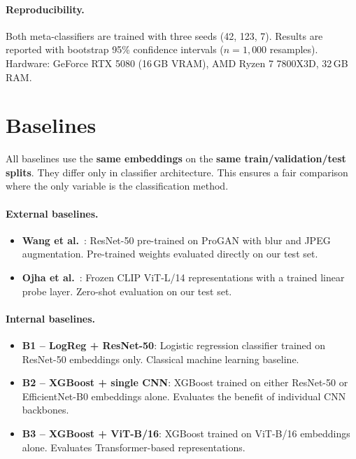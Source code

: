 \paragraph{Reproducibility.}
Both meta-classifiers are trained with three seeds (42, 123, 7). Results are reported with bootstrap 95\% confidence intervals ($n = 1{,}000$ resamples). Hardware: GeForce RTX 5080 (16\,GB VRAM), AMD Ryzen 7 7800X3D, 32\,GB RAM.

\section{Baselines}\label{sec:baselines}

All baselines use the \textbf{same embeddings} on the \textbf{same train/validation/test splits}. They differ only in classifier architecture. This ensures a fair comparison where the only variable is the classification method.

\paragraph{External baselines.}
\begin{itemize}
    \item \textbf{Wang et al.}~\cite{wang2020cnn}: ResNet-50 pre-trained on ProGAN with blur and JPEG augmentation. Pre-trained weights evaluated directly on our test set.
    \item \textbf{Ojha et al.}~\cite{ojha2023towards}: Frozen CLIP ViT-L/14 representations with a trained linear probe layer. Zero-shot evaluation on our test set.
\end{itemize}

\paragraph{Internal baselines.}
\begin{itemize}
    \item \textbf{B1 -- LogReg + ResNet-50}: Logistic regression classifier trained on ResNet-50 embeddings only. Classical machine learning baseline.
    \item \textbf{B2 -- XGBoost + single CNN}: XGBoost trained on either ResNet-50 or EfficientNet-B0 embeddings alone. Evaluates the benefit of individual CNN backbones.
    \item \textbf{B3 -- XGBoost + ViT-B/16}: XGBoost trained on ViT-B/16 embeddings alone. Evaluates Transformer-based representations.
\end{itemize}


